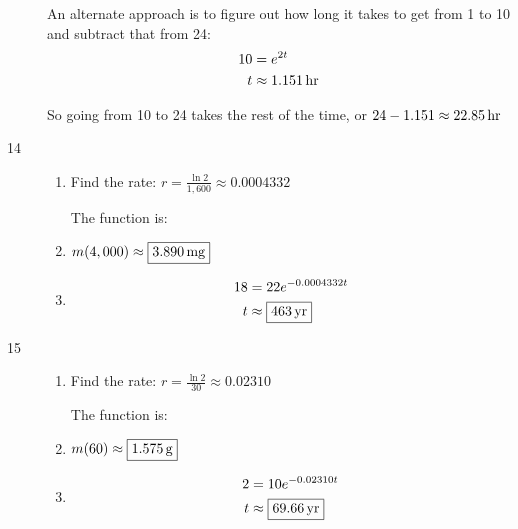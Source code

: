 \documentclass{exam}
\begin{document}
\begin{description}
        An alternate approach is to figure out how long it takes to get from 1 to 10 and subtract that from 24:
        \begin{align*}
          10 & = e^{2t} \\
          t  & \approx \unit[1.151]{hr} \\
        \end{align*}

        So going from 10 to 24 takes the rest of the time, or $24 - 1.151 \approx \unit[22.85]{hr} $

      \item[14] 
        \begin{enumerate}[a]
          \item Find the rate: $r = \frac{\ln 2}{1,600} \approx 0.0004332$

            The function is: 

          \item $m(4,000) \approx \boxed{\unit[3.890]{mg}}$

          \item
            \begin{align*}
              18 & = 22 e^{-0.0004332 t} \\
              t  & \approx \boxed{\unit[463]{yr}} \\
            \end{align*}

        \end{enumerate}

      \item[15] 
        \begin{enumerate}[a]
          \item Find the rate: $r = \frac{\ln 2}{30} \approx 0.02310$

            The function is: 

          \item $m(60) \approx \boxed{\unit[1.575]{g}}$

          \item
            \begin{align*}
              2 & = 10 e^{-0.02310 t} \\
              t  & \approx \boxed{\unit[69.66]{yr}} \\
            \end{align*}

        \end{enumerate}


\end{description}
\end{document}
